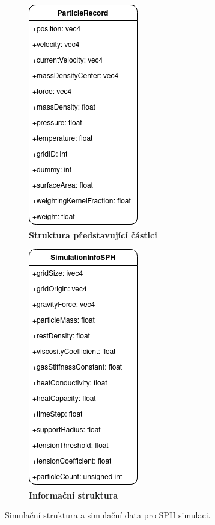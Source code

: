 \begin{figure}[h]
	\centering
	\begin{subfigure}[t]{.5\textwidth}
			\centering
        	\includegraphics[scale=0.6]{obrazky-figures/ParticleRecord.png}
        	\caption{\textbf{Struktura představující částici}}
        	\label{fig:ParticleRecord}
	\end{subfigure}%
	\begin{subfigure}[t]{.5\textwidth}
		\centering
		\includegraphics[scale=0.6]{obrazky-figures/SimulationInfoSPH.png}
		\caption{\textbf{Informační struktura}}
		\label{fig:SimInfoSPH}
	\end{subfigure}
	\caption{Simulační struktura a simulační data pro SPH simulaci.}
	\label{fig:structsSPH}
\end{figure}

